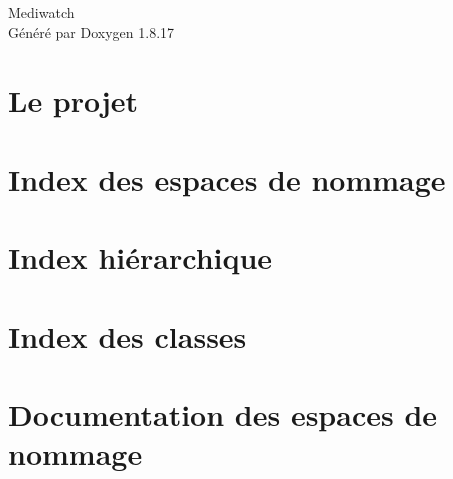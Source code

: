 \let\mypdfximage\pdfximage\def\pdfximage{\immediate\mypdfximage}\documentclass[twoside]{book}
\newcommand{\+}{\discretionary{\mbox{\scriptsize$\hookleftarrow$}}{}{}}
\newcommand{\clearemptydoublepage}{%
  \newpage{\pagestyle{empty}\cleardoublepage}%
}
\begin{document}
\hypersetup{pageanchor=false,
             bookmarksnumbered=true,
             pdfencoding=unicode
            }
\begin{titlepage}
\vspace*{7cm}
\begin{center}%
{\Large Mediwatch }\\
\vspace*{1cm}
{\large Généré par Doxygen 1.8.17}\\
\end{center}
\end{titlepage}
\clearemptydoublepage
{}
\tableofcontents
\clearemptydoublepage
{}
\hypersetup{pageanchor=true}

\chapter{Le projet}
\label{index}\hypertarget{index}{}
\chapter{Index des espaces de nommage}

\chapter{Index hiérarchique}

\chapter{Index des classes}

\chapter{Documentation des espaces de nommage}































\end{document}
